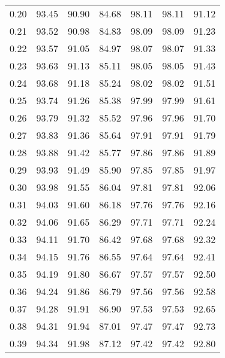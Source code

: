 \begin{tabular}{|c|c|c|c|c|c|c|}
      0.20 &     93.45 &     90.90 &      84.68 &   98.11 &      98.11 &         91.12 \\
      0.21 &     93.52 &     90.98 &      84.83 &   98.09 &      98.09 &         91.23 \\
      0.22 &     93.57 &     91.05 &      84.97 &   98.07 &      98.07 &         91.33 \\
      0.23 &     93.63 &     91.13 &      85.11 &   98.05 &      98.05 &         91.43 \\
      0.24 &     93.68 &     91.18 &      85.24 &   98.02 &      98.02 &         91.51 \\
      0.25 &     93.74 &     91.26 &      85.38 &   97.99 &      97.99 &         91.61 \\
      0.26 &     93.79 &     91.32 &      85.52 &   97.96 &      97.96 &         91.70 \\
      0.27 &     93.83 &     91.36 &      85.64 &   97.91 &      97.91 &         91.79 \\
      0.28 &     93.88 &     91.42 &      85.77 &   97.86 &      97.86 &         91.89 \\
      0.29 &     93.93 &     91.49 &      85.90 &   97.85 &      97.85 &         91.97 \\
      0.30 &     93.98 &     91.55 &      86.04 &   97.81 &      97.81 &         92.06 \\
      0.31 &     94.03 &     91.60 &      86.18 &   97.76 &      97.76 &         92.16 \\
      0.32 &     94.06 &     91.65 &      86.29 &   97.71 &      97.71 &         92.24 \\
      0.33 &     94.11 &     91.70 &      86.42 &   97.68 &      97.68 &         92.32 \\
      0.34 &     94.15 &     91.76 &      86.55 &   97.64 &      97.64 &         92.41 \\
      0.35 &     94.19 &     91.80 &      86.67 &   97.57 &      97.57 &         92.50 \\
      0.36 &     94.24 &     91.86 &      86.79 &   97.56 &      97.56 &         92.58 \\
      0.37 &     94.28 &     91.91 &      86.90 &   97.53 &      97.53 &         92.65 \\
      0.38 &     94.31 &     91.94 &      87.01 &   97.47 &      97.47 &         92.73 \\
      0.39 &     94.34 &     91.98 &      87.12 &   97.42 &      97.42 &         92.80 \\

\end{tabular}
